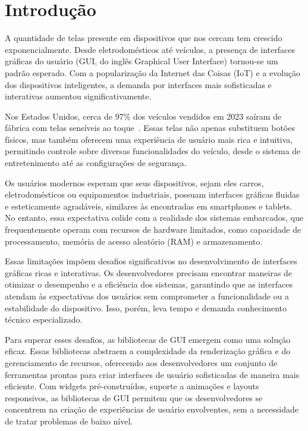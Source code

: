 \chapter{Introdução}

A quantidade de telas presente em dispositivos que nos cercam tem crescido exponencialmente. Desde eletrodomésticos até veículos, a presença de interfaces gráficas do usuário (GUI, do inglês Graphical User Interface) tornou-se um padrão esperado. Com a popularização da Internet das Coisas (IoT) e a evolução dos dispositivos inteligentes, a demanda por interfaces mais sofisticadas e interativas aumentou significativamente.

Nos Estados Unidos, cerca de 97\% dos veículos vendidos em 2023 saíram de fábrica com telas sensíveis ao toque~\cite{forbes-touchscreens}. Essas telas não apenas substituem botões físicos, mas também oferecem uma experiência de usuário mais rica e intuitiva, permitindo controle sobre diversas funcionalidades do veículo, desde o sistema de entretenimento até as configurações de segurança.

Os usuários modernos esperam que seus dispositivos, sejam eles carros, eletrodomésticos ou equipamentos industriais, possuam interfaces gráficas fluidas e esteticamente agradáveis, similares às encontradas em smartphones e tablets. No entanto, essa expectativa colide com a realidade dos sistemas embarcados, que frequentemente operam com recursos de hardware limitados, como capacidade de processamento, memória de acesso aleatório (RAM) e armazenamento.

Essas limitações impõem desafios significativos no desenvolvimento de interfaces gráficas ricas e interativas. Os desenvolvedores precisam encontrar maneiras de otimizar o desempenho e a eficiência dos sistemas, garantindo que as interfaces atendam às expectativas dos usuários sem comprometer a funcionalidade ou a estabilidade do dispositivo. Isso, porém, leva tempo e demanda conhecimento técnico especializado.

Para superar esses desafios, as bibliotecas de GUI emergem como uma solução eficaz. Essas bibliotecas abstraem a complexidade da renderização gráfica e do gerenciamento de recursos, oferecendo aos desenvolvedores um conjunto de ferramentas prontas para criar interfaces de usuário sofisticadas de maneira mais eficiente. Com widgets pré-construídos, suporte a animações e layouts responsivos, as bibliotecas de GUI permitem que os desenvolvedores se concentrem na criação de experiências de usuário envolventes, sem a necessidade de tratar problemas de baixo nível.

